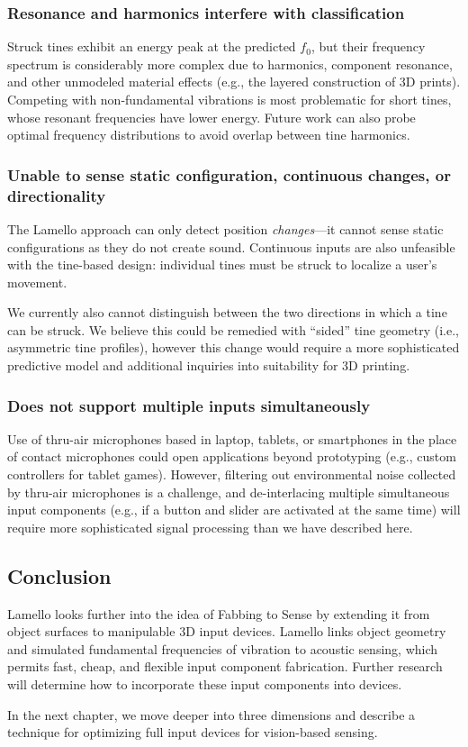     \subsubsection{Resonance and harmonics interfere with classification}
    Struck tines exhibit an energy peak at the predicted $f_0$, but their frequency spectrum is considerably more complex due to harmonics, component resonance, and other unmodeled material effects (e.g., the layered construction of 3D prints). Competing with non-fundamental vibrations is most problematic for short tines, whose resonant frequencies have lower energy. Future work can also probe optimal frequency distributions to avoid overlap between tine harmonics.

    \subsubsection{Unable to sense static configuration, continuous changes, or directionality}

    The Lamello approach can only detect position \emph{changes}---it cannot sense static configurations as they do not create sound. Continuous inputs are also unfeasible with the tine-based design: individual tines must be struck to localize a user's movement.
    
    We currently also cannot distinguish between the two directions in which a tine can be struck. We believe this could be remedied with ``sided'' tine geometry (i.e., asymmetric tine profiles), however this change would require a more sophisticated predictive model and additional inquiries into suitability for 3D printing.
    
    \subsubsection{Does not support multiple inputs simultaneously}
    Use of thru-air microphones based in laptop, tablets, or smartphones in the place of contact microphones could open applications beyond prototyping (e.g., custom controllers for tablet games). However, filtering out environmental noise collected by thru-air microphones is a challenge, and de-interlacing multiple simultaneous input components (e.g., if a button and slider are activated at the same time) will require more sophisticated signal processing than we have described here.

\subsection{Conclusion}

Lamello looks further into the idea of Fabbing to Sense by extending it from object surfaces to manipulable 3D input devices. Lamello links object geometry and simulated fundamental frequencies of vibration to acoustic sensing, which permits fast, cheap, and flexible input component fabrication. Further research will determine how to incorporate these input components into devices.

In the next chapter, we move deeper into three dimensions and describe a technique for optimizing full input devices for vision-based sensing.